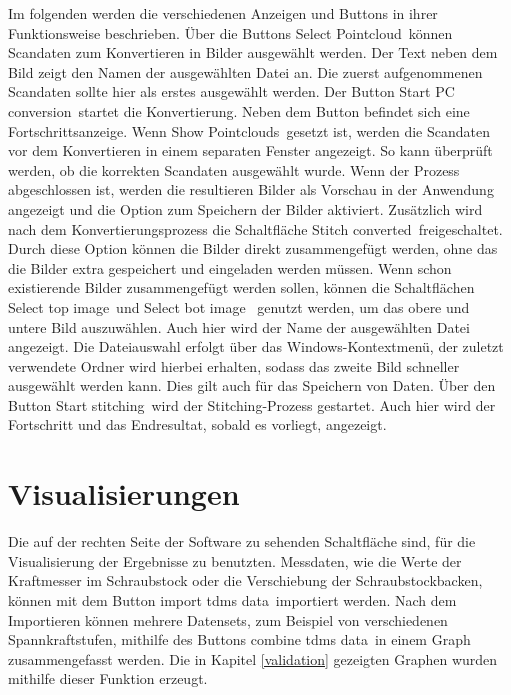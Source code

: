 Im folgenden werden die verschiedenen Anzeigen und Buttons in ihrer Funktionsweise beschrieben.
Über die Buttons \glqq Select Pointcloud\grqq~können Scandaten zum Konvertieren in Bilder
ausgewählt werden. Der Text neben dem Bild zeigt den Namen der ausgewählten 
Datei an. Die zuerst aufgenommenen Scandaten sollte hier als erstes ausgewählt werden.
Der Button \glqq Start PC conversion\grqq~startet die Konvertierung. Neben dem Button 
befindet sich eine Fortschrittsanzeige.
Wenn \glqq Show Pointclouds\grqq~gesetzt ist, werden die Scandaten vor dem 
Konvertieren in einem separaten Fenster angezeigt. So kann überprüft werden, ob die 
korrekten Scandaten ausgewählt wurde.
Wenn der Prozess abgeschlossen ist, werden die resultieren Bilder als Vorschau in der 
Anwendung angezeigt und die Option zum Speichern der Bilder aktiviert.
Zusätzlich wird nach dem Konvertierungsprozess die Schaltfläche 
\glqq Stitch converted\grqq~freigeschaltet. Durch diese Option können die 
Bilder direkt zusammengefügt werden, ohne das die Bilder extra gespeichert und 
eingeladen werden müssen. Wenn schon existierende Bilder zusammengefügt werden sollen, 
können die Schaltflächen \glqq Select top image\grqq~und \glqq Select bot image\grqq~
genutzt werden, um das obere und untere Bild auszuwählen. Auch hier wird der Name der 
ausgewählten Datei angezeigt. Die Dateiauswahl erfolgt über das 
Windows-Kontextmenü, der zuletzt verwendete Ordner wird hierbei erhalten, sodass das 
zweite Bild schneller ausgewählt werden kann. Dies gilt auch für das Speichern von Daten.
Über den Button \glqq Start stitching\grqq~wird der Stitching-Prozess gestartet. 
Auch hier wird der Fortschritt und das Endresultat, sobald es vorliegt, angezeigt.

\section{Visualisierungen}

Die auf der rechten Seite der Software zu sehenden Schaltfläche sind, für die 
Visualisierung der Ergebnisse zu benutzten. 
Messdaten, wie die Werte der Kraftmesser im Schraubstock oder die Verschiebung der 
Schraubstockbacken, können 
mit dem Button \glqq import tdms data\grqq~importiert werden. Nach dem Importieren 
können mehrere Datensets, zum Beispiel von verschiedenen Spannkraftstufen, mithilfe 
des Buttons \glqq combine tdms data\grqq~in einem Graph zusammengefasst werden.
Die in Kapitel \ref{validation} gezeigten Graphen wurden mithilfe dieser Funktion erzeugt.

